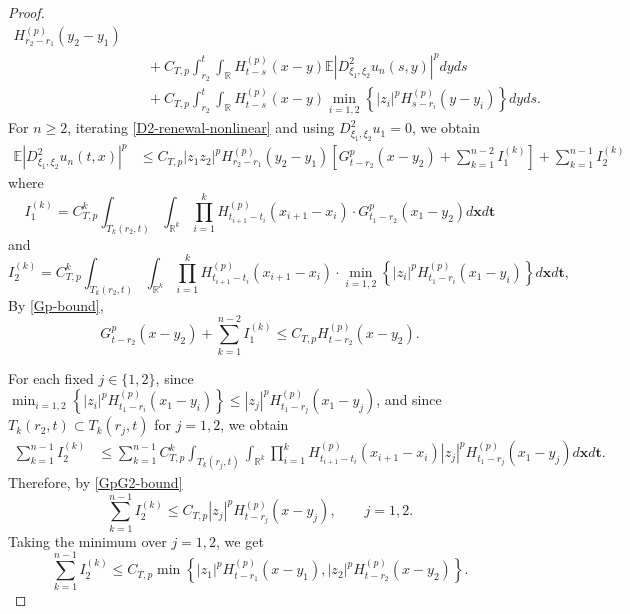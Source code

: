 \documentclass[10pt,a4paper]{amsart}
\def\bE{\mathbb{E}}
\def\bR{\mathbb{R}}
\begin{document}
\begin{proof}
\begin{equation}
\begin{aligned}
H_{r_2-r_1}^{(p)}(y_2-y_1)
\\
&\quad+
C_{T,p}
\int_{r_2}^t\int_{\bR}
H_{t-s}^{(p)}(x-y)
\bE\left|D^2_{\xi_1,\xi_2}u_n(s,y)\right|^p
dy ds
\\
&\quad+
C_{T,p}
\int_{r_2}^t\int_{\bR}
H_{t-s}^{(p)}(x-y)
\min_{i=1,2}
\left\{
|z_i|^pH_{s-r_i}^{(p)}(y-y_i)
\right\}
dy ds .
\end{aligned}
\end{equation}
 For $n\ge2$, iterating \eqref{D2-renewal-nonlinear} and using
$D^2_{\xi_1,\xi_2}u_1=0$, we obtain
\begin{align*}
\bE\left|D^2_{\xi_1,\xi_2}u_n(t,x)\right|^p&\le C_{T,p}|z_1z_2|^p
H_{r_2-r_1}^{(p)}(y_2-y_1) \left[ G_{t-r_2}^p(x-y_2)+ \sum_{k=1}^{n-2}
I_1^{(k)}\right]+\sum_{k=1}^{n-1}
 I_2^{(k)}
\end{align*}
where
\begin{equation*}
I_1^{(k)}= C_{T,p}^k
\int_{T_k(r_2,t)}
\int_{\bR^k}
\prod_{i=1}^{k}
H_{t_{i+1}-t_i}^{(p)}(x_{i+1}-x_i)\cdot
G_{t_1-r_2}^p(x_1-y_2)
d\pmb{x}d\pmb{t}  
\end{equation*}
and 
\begin{equation*}
I_2^{(k)}= C_{T,p}^k
\int_{T_k(r_2,t)}
\int_{\bR^k}
\prod_{i=1}^{k}
H_{t_{i+1}-t_i}^{(p)}(x_{i+1}-x_i) \cdot
\min_{i=1,2}\left\{
|z_i|^pH_{t_1-r_i}^{(p)}(x_1-y_i)
\right\}
d\pmb{x}d\pmb{t},
\end{equation*}
By \eqref{Gp-bound},
\begin{equation}
\label{D2-source-iteration-bound}
G_{t-r_2}^p(x-y_2)
+
\sum_{k=1}^{n-2} I_1^{(k)}
\le
C_{T,p}H_{t-r_2}^{(p)}(x-y_2).
\end{equation}


For each fixed $j\in\{1,2\}$, since $\min_{i=1,2}
\left\{
|z_i|^pH_{t_1-r_i}^{(p)}(x_1-y_i)
\right\}
\le
|z_j|^pH_{t_1-r_j}^{(p)}(x_1-y_j)$, and since $T_k(r_2,t)\subset T_k(r_j,t)$ for $j=1,2$, we obtain
\begin{align*}
\sum_{k=1}^{n-1} I_2^{(k)}
&\le
\sum_{k=1}^{n-1}
C_{T,p}^k
\int_{T_k(r_j,t)}
\int_{\bR^k}
\prod_{i=1}^{k}
H_{t_{i+1}-t_i}^{(p)}(x_{i+1}-x_i)
|z_j|^pH_{t_1-r_j}^{(p)}(x_1-y_j)
d\pmb{x}d\pmb{t}.
\end{align*}
Therefore, by \eqref{GpG2-bound}
\begin{equation*}
\sum_{k=1}^{n-1} I_2^{(k)}
\le
C_{T,p}
|z_j|^pH_{t-r_j}^{(p)}(x-y_j),
\qquad j=1,2.
\end{equation*}
Taking the minimum over $j=1,2$, we get
\begin{equation}
\label{D2-min-iteration-bound}
\sum_{k=1}^{n-1} I_2^{(k)}
\le
C_{T,p}
\min\left\{
|z_1|^pH_{t-r_1}^{(p)}(x-y_1),
|z_2|^pH_{t-r_2}^{(p)}(x-y_2)
\right\}.
\end{equation}






\end{proof}
\end{document}

